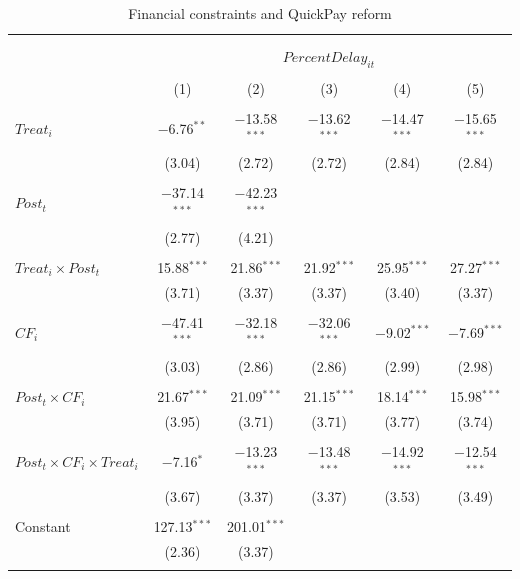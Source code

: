 \documentclass[
]{article}
\begin{document}
\begin{table}[H] \centering 
  \caption{Financial constraints and QuickPay reform} 
  \label{} 
\small 
\begin{tabular}{@{\extracolsep{-2pt}}lccccc} 
\\[-1.8ex]\hline 
\hline \\[-1.8ex] 
\\[-1.8ex] & \multicolumn{5}{c}{$PercentDelay_{it}$  } \\ 
\\[-1.8ex] & (1) & (2) & (3) & (4) & (5)\\ 
\hline \\[-1.8ex] 
 $Treat_i$ & $-$6.76$^{**}$ & $-$13.58$^{***}$ & $-$13.62$^{***}$ & $-$14.47$^{***}$ & $-$15.65$^{***}$ \\ 
  & (3.04) & (2.72) & (2.72) & (2.84) & (2.84) \\ 
  & & & & & \\ 
 $Post_t$ & $-$37.14$^{***}$ & $-$42.23$^{***}$ &  &  &  \\ 
  & (2.77) & (4.21) &  &  &  \\ 
  & & & & & \\ 
 $Treat_i \times Post_t$ & 15.88$^{***}$ & 21.86$^{***}$ & 21.92$^{***}$ & 25.95$^{***}$ & 27.27$^{***}$ \\ 
  & (3.71) & (3.37) & (3.37) & (3.40) & (3.37) \\ 
  & & & & & \\ 
 $CF_i$ & $-$47.41$^{***}$ & $-$32.18$^{***}$ & $-$32.06$^{***}$ & $-$9.02$^{***}$ & $-$7.69$^{***}$ \\ 
  & (3.03) & (2.86) & (2.86) & (2.99) & (2.98) \\ 
  & & & & & \\ 
 $Post_t \times CF_i$ & 21.67$^{***}$ & 21.09$^{***}$ & 21.15$^{***}$ & 18.14$^{***}$ & 15.98$^{***}$ \\ 
  & (3.95) & (3.71) & (3.71) & (3.77) & (3.74) \\ 
  & & & & & \\ 
 $Post_t \times CF_i \times Treat_i$ & $-$7.16$^{*}$ & $-$13.23$^{***}$ & $-$13.48$^{***}$ & $-$14.92$^{***}$ & $-$12.54$^{***}$ \\ 
  & (3.67) & (3.37) & (3.37) & (3.53) & (3.49) \\ 
  & & & & & \\ 
 Constant & 127.13$^{***}$ & 201.01$^{***}$ &  &  &  \\ 
  & (2.36) & (3.37) &  &  &  \\ 
  & & & & & \\ 

\end{tabular}
\end{table}
\end{document}
